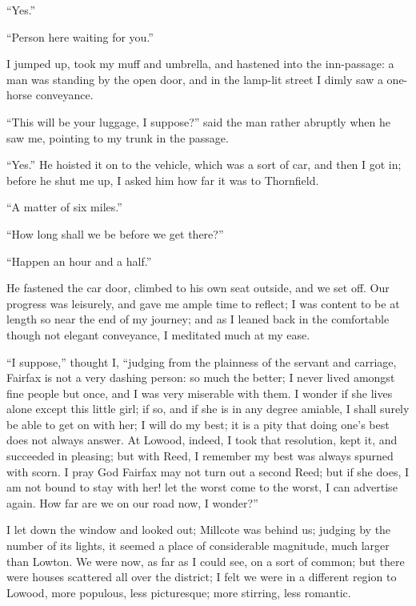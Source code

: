 \enquote{Yes.}

\enquote{Person here waiting for you.}

I jumped up, took my muff and umbrella, and hastened into the
inn-passage: a man was standing by the open door, and in the lamp-lit
street I dimly saw a one-horse conveyance.

\enquote{This will be your luggage, I suppose?} said the man rather
abruptly when he saw me, pointing to my trunk in the passage.

\enquote{Yes.} He hoisted it on to the vehicle, which was a sort of
car, and then I got in; before he shut me up, I asked him how far it was
to Thornfield.

\enquote{A matter of six miles.}

\enquote{How long shall we be before we get there?}

\enquote{Happen an hour and a half.}

He fastened the car door, climbed to his own seat outside, and we set
off. Our progress was leisurely, and gave me ample time to reflect; I
was content to be at length so near the end of my journey; and as I
leaned back in the comfortable though not elegant conveyance, I
meditated much at my ease.

\enquote{I suppose,} thought I, \enquote{judging from the plainness of
	the servant and carriage, \Mrs{} Fairfax is not a very dashing person: so
	much the better; I never lived amongst fine people but once, and I was
	very miserable with them. I wonder if she lives alone except this
	little girl; if so, and if she is in any degree amiable, I shall surely
	be able to get on with her; I will do my best; it is a pity that doing
	one's best does not always answer. At Lowood, indeed, I took that
	resolution, kept it, and succeeded in pleasing; but with \Mrs{} Reed, I
	remember my best was always spurned with scorn. I pray God \Mrs{} Fairfax
	may not turn out a second \Mrs{} Reed; but if she does, I am not bound to
	stay with her! let the worst come to the worst, I can advertise again.
	How far are we on our road now, I wonder?}

I let down the window and looked out; Millcote was behind us; judging by
the number of its lights, it seemed a place of considerable magnitude,
much larger than Lowton. We were now, as far as I could see, on a sort
of common; but there were houses scattered all over the district; I felt
we were in a different region to Lowood, more populous, less
picturesque; more stirring, less romantic.


